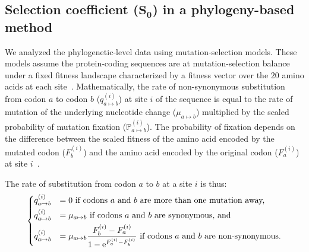 \documentclass[10pt,letterpaper]{article}
\newcommand{\e}{\text{e}}
\newcommand{\proba}{\mathbb{P}}
\newcommand{\Sphy}{S_{0}}
\providecommand{\DIFaddbegin}{} %
\providecommand{\DIFaddend}{} %
\newcommand{\DIFaddincludegraphics}[2][]{{\color{blue}\fbox{\DIFOincludegraphics[#1]{#2}}}} %
\DeclareRobustCommand{\DIFaddbegin}{\DIFOaddbegin \let\includegraphics\DIFaddincludegraphics} %
\DeclareRobustCommand{\DIFaddend}{\DIFOaddend \let\includegraphics\DIFOincludegraphics} %
\begin{document}
\subsection{Selection coefficient (\texorpdfstring{$\bm{\Sphy}$}{S₀}) in a phylogeny-based method}
\label{subsec:s-phylogeny-method}

We analyzed the phylogenetic-level data using mutation-selection models.
These models assume the protein-coding sequences are at mutation-selection balance under a fixed fitness landscape characterized by a fitness vector over the $20$ amino acids at each site~\cite{yang_mutationselection_2008, halpern_evolutionary_1998, rodrigue_mechanistic_2010}.
Mathematically, the rate of non-synonymous substitution from codon $a$ to codon $b$ ($q_{a \mapsto b}^{(i)}$) at site $i$ of the sequence is equal to the rate of mutation of the underlying nucleotide change ($\mu_{a \mapsto b}$) multiplied by the scaled probability of mutation fixation ($\proba_{a \mapsto b}^{(i)}$).
The probability of fixation depends on the difference between the scaled fitness of the amino acid encoded by the mutated codon ($F_b^{(i)}$) and the amino acid encoded by the original codon ($F_a^{(i)}$) at site $i$~\cite{wright_evolution_1931, fisher_genetical_1930}.

The rate of substitution from codon $a$ to $b$ at a site $i$ is thus:
\begin{equation}
\begin{dcases}
q_{a \mapsto b}^{(i)} & = 0 \text{ if codons $a$ and $b$ are more than one mutation away,} \\
q_{a \mapsto b}^{(i)} & = \mu_{a \mapsto b} \text{ if codons $a$ and $b$ are synonymous, and}\\
q_{a \mapsto b}^{(i)} & = \mu_{a \mapsto b} \dfrac{F_b^{(i)} - F_a^{(i)}}{1 - \e^{F_a^{(i)} - F_b^{(i)}}} \text{ if codons $a$ and $b$ are non-synonymous}.
\end{dcases}\DIFaddbegin \label{eq:subs}
\DIFaddend \end{equation}
\end{document}
